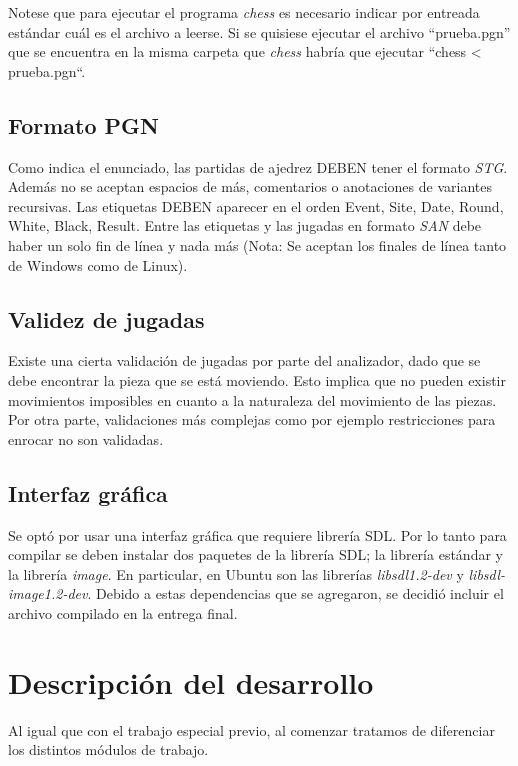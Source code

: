 \documentclass[a4paper,10pt]{article}
\begin{document}
Notese que para ejecutar el programa \textit{chess} es necesario indicar por entreada estándar cuál es el archivo a leerse. Si se 
quisiese ejecutar el archivo ``prueba.pgn'' que se encuentra en la misma carpeta que \textit{chess} habría que ejecutar ``chess < 
prueba.pgn``.

\subsection{Formato PGN}

Como indica el enunciado, las partidas de ajedrez DEBEN tener el formato \textit{STG}. Además no se aceptan espacios de más, comentarios 
o anotaciones de variantes recursivas. Las etiquetas DEBEN aparecer en el orden Event, Site, Date, Round, White, Black, Result.
 Entre las etiquetas y las jugadas en formato \textit{SAN} debe haber un solo fin de línea y nada más (Nota: Se aceptan los finales de línea 
tanto de Windows como de Linux).

\subsection{ Validez de jugadas}

Existe una cierta validación de jugadas por parte del analizador, dado que se debe encontrar la pieza que se está moviendo. Esto implica que 
no pueden existir movimientos imposibles en cuanto a la naturaleza del movimiento de las piezas. Por otra parte, validaciones más complejas como 
por ejemplo restricciones para enrocar no son validadas.

\subsection{ Interfaz gráfica}

Se optó por usar una interfaz gráfica que requiere librería SDL. Por lo tanto para compilar se deben instalar dos paquetes de la librería SDL; la librería 
estándar y la librería \textit{image}. En particular, en Ubuntu son las librerías \textit{libsdl1.2-dev} y \textit{libsdl-image1.2-dev}. Debido a estas 
dependencias que se agregaron, se decidió incluir el archivo compilado en la entrega final.

\newpage

\section{Descripción del desarrollo}
  Al igual que con el trabajo especial previo, al comenzar tratamos de diferenciar los distintos módulos de trabajo. 
\end{document}
